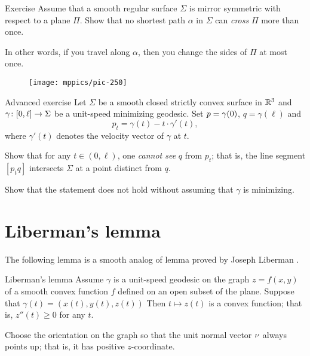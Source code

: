 \begin{thm}{Exercise}\label{ex:min-geod+plane}
Assume that a smooth regular surface $\Sigma$ is mirror symmetric with respect to a plane $\Pi$.
Show that no shortest path $\alpha$ in $\Sigma$ can \emph{cross} $\Pi$ more than once.


In other words, if you travel along $\alpha$, then you change the sides of $\Pi$ at most once. 
\end{thm}

{

\begin{wrapfigure}{r}{48 mm}
\vskip-4mm
\centering
\texttt{[image: mppics/pic-250]}
\vskip-0mm
\end{wrapfigure}

\begin{thm}{Advanced exercise}\label{ex:milka}
Let $\Sigma$ be a smooth closed strictly convex surface 
in $\mathbb{R}^3$ 
and $\gamma\:[0,\ell]\z\to \Sigma$ be a unit-speed minimizing geodesic.
Set $p\z=\gamma(0)$, $q=\gamma(\ell)$ and 
$$p_t=\gamma(t)-t\cdot\gamma'(t),$$ 
where $\gamma'(t)$ denotes the velocity vector of $\gamma$ at $t$.

Show that for any $t\in (0,\ell)$,
one {}\emph{cannot see}  $q$ from $p_t$;
that is, the line segment $[p_tq]$ intersects $\Sigma$ at a point distinct from $q$.

Show that the statement does not hold without assuming that $\gamma$ is minimizing.
\end{thm}

}

\section{Liberman's lemma}

The following lemma is a smooth analog of lemma proved by Joseph Liberman \cite{liberman}.

\begin{thm}{Liberman's lemma}\label{lem:liberman}
Assume $\gamma$ is a unit-speed geodesic on the graph $z=f(x,y)$ of a smooth convex function $f$ defined on an open subset of the plane.
Suppose that $\gamma(t)=(x(t),y(t),z(t))$
Then $t\mapsto z(t)$ is a convex function; that is, $z''(t)\ge 0$ for any $t$.
\end{thm}

Choose the orientation on the graph so that the unit normal vector $\nu$ always points up;
that is, it has positive $z$-coordinate.

